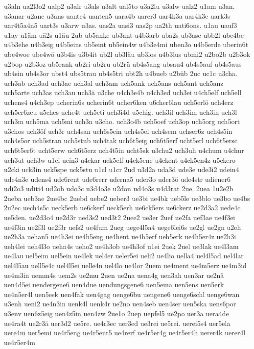 {u3aln
ua2l3o2
ualp2
u3alr
u3als
u3alt
ual5to
u3a2lu
u3alw
ualz2
u1am
u3an.
u3anar
u2ane
u3ans
uante4
uanten5
uara4b
uarer3
uar4k3a
uar4k3e
uark3s
uar4t5a4n5
uart3s
u3arw
u3as.
uas2a
uasi3
uas2p
ua2th
uati6ons.
u1au
uauf3
u1ay
u1äm
uä2s
u1äu
2ub
ub5anke
ub3ant
u4b3arb
uba2s
ub3asc
ubb2l
ube4be
u4b3ehe
u4b3eig
u4b5eins
ub5eint
ub5ein4w
u4b3e4mi
uben3o
u4b5erde
uberin6t
ube4woe
ube4wö
u3b4is
u3b4it
ub2l
ub3läu
ub3los
u4b3lus
ubmi2
u2bo2b
u2b3ok
u2bop
u2b3oz
ub5rank
ub2ri
ub2ru
ub2rü
ub4s5ang
ubsau4
ub4s5auf
ub4s5aus
ub4sin
ub4s3or
ubst4
ubs5trau
ub4s5tri
ubt2h
u4bueb
u2büb
2uc
uc1c
u3cha.
uch3ab
uch3ad
uch3ae
uch3al
uch3am
uch5ank
uch5ans
uch5ant
uch5anz
uch5arte
uch3as
uch3au
uch3ä
u3che
u4ch3e4b
u4ch3ed
uch3ei
u4ch5elf
uch5ell
uchens4
u4ch3ep
ucherin6s
ucherin6t
ucher6ken
u6cher6lau
uch5erlö
uch4erz
uch5er6zeu
u5ches
uche4t
uch5eti
uch3i4d
u5chig.
uch3il
uch3im
uch3in
uch3l
uch3m
uch5ma
uch5mi
uch3n
u3cho.
uch3o4b
uch5oef
uch3op
uch5org
uch5ort
u3chos
uch3öf
uch3r
uch4san
uch6s5ein
uch4s5el
uch4sem
uchser6z
uch4s5in
uch4s5or
uch5stran
uch5stub
uch4tak
uch6t5eig
uch6t5erf
ucht5erl
uch6t5ersc
uch6t5er6t
ucht5erw
uch6t5erz
uch4t5in
ucht5sk
u3chu2
uch3uh
u4chum
u4chur
uch3ut
uch3w
u1ci
ucin3
u4ckar
uck5elf
u4ck5ene
u4ckent
u4ck5en4z
u5ckero
u2cki
uck3in
uck5spe
uck5stu
u1cl
u1cr
2ud
u3d2a
uda3d
ude3e
ude3i2
udein4
ude4n3e
udens4
ude6rent
ude6rerr
uderna5
uder3o
uder3ö
ude4str
udiener6
udi2o3
uditi4
ud2ob
udo3c
u3d4o3e
u2don
ud4o3s
u4d3rat
2ue.
2uea
1u2e2b
2ueba
ueb3ae
2ue4bc
2uebd
uebe2
ueber3
ue3bi
ue4bk
ueb5le
ue3blo
ue3bo
ue4bs
2u2ec
uech4s5c
ueck5erb
ue6ckerf
ueck5erh
ue6ck5ers
ue6ckerz
ue2d3a2
uede4c
ue5den.
ue2d3o4
ue2d3r
ued3s2
ued3t2
2uee2
ue3er
2uef
ue2fa
uef3ae
ue4f3ei
ue4f3in
ue2f3l
ue2f3r
uefs2
ue4fum
2ueg
uege4l5a4
uege6lei6s
ue2gl
ue2gn
u2eh
ue2h3a
uehan5
ue4h3ei
ue4h5eng
ue4hent
ue4h5erf
ueh5erk
ue4h5er4z
ue2h3i
ueh4lei
ueh4l3o
uehn4s
ueho2
ue4h3ob
ue4h3of
u1ei
2uek
2uel
ue3lak
ue4l3am
ue4lau
uel5eim
uel5ein
ue4lek
uel4er
ueler5ei
ueli2
ue4lio
uella4
uel4l5ad
uel4lar
uel4l5au
uell5e4c
uel4l5ei
uelle4n
uel4lo
ue4lor
2uem
ue4ment
ue4m5erz
ue4m3id
ue4m3in
uemm4s
uem2s
ue2mu
2uen
ue2na
uena4g
uen3ah
uen3ar
ue2nä
uen4d5ei
uendergene6
uen4due
uendungsgene6
uen5ema
uen5ens
uen5erk
ue4n5er4l
uen5esk
uen4fak
uen4gag
uenge6bu
uengene6
uenge6schl
uenge6wan
u3enh
ueni2
ue4n3in
uenk4l
uenk4r
ue2no
uen4seb
uen4ser
uen5ska
uens6por
u3env
uen6z5eig
uen4z5in
uen4zw
2ue1o
2uep
uepfel5
ue2po
uer3a
uera4de
ue4ra4t
ue2r3ä
uer3d2
ue5re.
ue4r3ec
uer3ed
ue3rei
ue5rei.
uerei5s4
uer5ela
uere4m
uer5emi
ue4r5eng
ue4r5ent5
ue4rerf
ue4r5er4g
ue4r5er4h
uerer4k
uerer4l
ue4r5er4m
}
